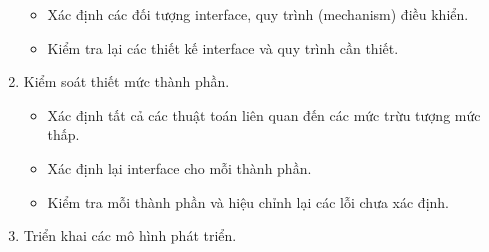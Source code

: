 \documentclass[./../SoftwareEngineering.tex]{subfiles}
\begin{document}
\begin{multicols}{2}
\begin{enumerate}
\begin{itemize}
				\item Xác định các đối tượng interface, quy trình (mechanism) điều khiển.
				
				\item Kiểm tra lại các thiết kế interface và quy trình cần thiết.
			\end{itemize}
			
			
			
			\item Kiểm soát thiết mức thành phần.
			\begin{itemize}
				\setlength\itemsep{0em}
				\item Xác định tất cả các thuật toán liên quan đến các mức trừu tượng mức thấp.
				
				\item Xác định lại interface cho mỗi thành phần.
				
				\item Kiểm tra mỗi thành phần và hiệu chỉnh lại các lỗi chưa xác định.
			\end{itemize}
			
			\item Triển khai các mô hình phát triển.
		\end{enumerate}	
	\end{multicols}
\end{document}
